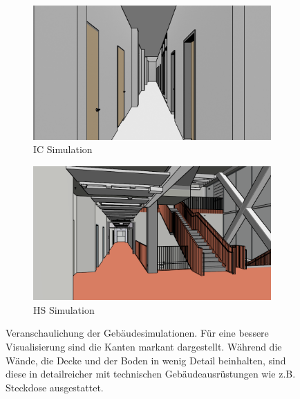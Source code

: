 \begin{figure}
	\centering
	\begin{subfigure}[t]{0.48\linewidth}
		\centering
		\includegraphics[width=\linewidth]{images/syn_dataset/ic00343.png}
		\caption{IC Simulation}
		\label{subfig:ic_syn_example}
	\end{subfigure}
	\hfill
	\begin{subfigure}[t]{0.48\linewidth}
		\centering
		\includegraphics[width=\linewidth]{images/syn_dataset/hs_gamma02162.png}
		\caption{HS Simulation}
		\label{subfig:hs_gamma_syn_example}
	\end{subfigure}
	\caption{Veranschaulichung der Gebäudesimulationen. Für eine bessere Visualisierung sind die Kanten markant dargestellt. Während die Wände, die Decke und der Boden in  wenig Detail beinhalten, sind diese in  detailreicher mit technischen Gebäudeausrüstungen wie z.B. Steckdose ausgestattet.}
	\label{fig:difference_3d}
\end{figure} 

